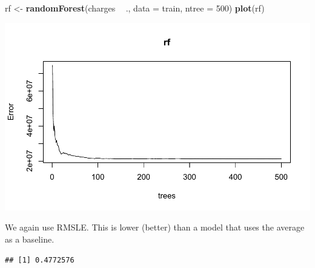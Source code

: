 \documentclass[openany]{book}
\newenvironment{Shaded}{\begin{snugshade}}{\end{snugshade}}
\newcommand{\ControlFlowTok}[1]{\textcolor[rgb]{0.13,0.29,0.53}{\textbf{#1}}}
\newcommand{\DataTypeTok}[1]{\textcolor[rgb]{0.13,0.29,0.53}{#1}}
\newcommand{\DecValTok}[1]{\textcolor[rgb]{0.00,0.00,0.81}{#1}}
\newcommand{\KeywordTok}[1]{\textcolor[rgb]{0.13,0.29,0.53}{\textbf{#1}}}
\newcommand{\NormalTok}[1]{#1}
\newcommand{\OperatorTok}[1]{\textcolor[rgb]{0.81,0.36,0.00}{\textbf{#1}}}
\newcommand{\StringTok}[1]{\textcolor[rgb]{0.31,0.60,0.02}{#1}}
\begin{document}
\begin{Shaded}
\begin{Highlighting}[]
\NormalTok{rf <-}\StringTok{ }\KeywordTok{randomForest}\NormalTok{(charges }\OperatorTok{~}\StringTok{ }\NormalTok{., }\DataTypeTok{data =}\NormalTok{ train, }\DataTypeTok{ntree =} \DecValTok{500}\NormalTok{)}
\KeywordTok{plot}\NormalTok{(rf)}
\end{Highlighting}
\end{Shaded}

\includegraphics{06-tree-based-models_files/figure-latex/unnamed-chunk-14-1.pdf}

We again use RMSLE. This is lower (better) than a model that uses the average as a baseline.

\begin{Shaded}
\end{Shaded}

\begin{verbatim}
## [1] 0.4772576
\end{verbatim}

\begin{Shaded}
\end{Shaded}
\end{document}
